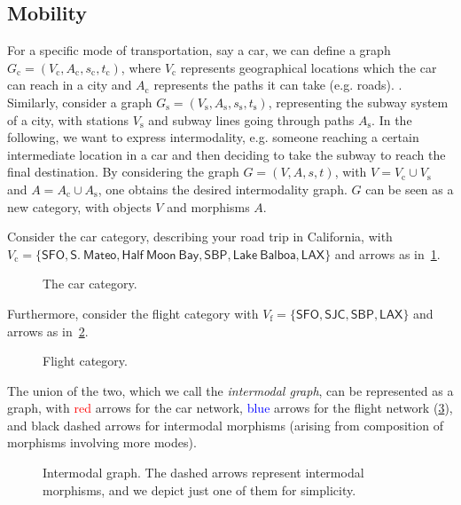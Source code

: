\subsection{Mobility}

For a specific mode of transportation, say a car, we can define a graph $G_\mathrm{c}=(V_\mathrm{c},A_\mathrm{c},s_\mathrm{c},t_\mathrm{c})$, where $V_\mathrm{c}$ represents geographical locations which the car can reach in a city and $A_\mathrm{c}$ represents the paths it can take (e.g. roads). . Similarly, consider a graph $G_\mathrm{s}=(V_\mathrm{s},A_\mathrm{s},s_\mathrm{s},t_\mathrm{s})$, representing the subway system of a city, with stations $V_\mathrm{s}$ and subway lines going through paths $A_\mathrm{s}$. In the following, we want to express intermodality, e.g. someone reaching a certain intermediate location in a car and then deciding to take the subway to reach the final destination. By considering the graph $G=(V,A,s,t)$, with $V=V_\mathrm{c}\cup V_\mathrm{s}$ and $A=A_\mathrm{c}\cup A_\mathrm{s}$, one obtains the desired intermodality graph. $G$ can be seen as a new category, with objects $V$ and morphisms $A$.
\begin{example}
Consider the car category, describing your road trip in California, with $V_\mathrm{c}=\{\mathsf{SFO},\mathsf{S.}\ \mathsf{Mateo},\mathsf{Half} \ \mathsf{Moon}\ \mathsf{Bay},\mathsf{SBP},\mathsf{Lake}\ \mathsf{Balboa},\mathsf{LAX}\}$ and arrows as in~\cref{fig:carcat}.

\begin{figure}[h!]
\begin{center}
\end{center}
\caption{The car category. \label{fig:carcat}}
\end{figure}

Furthermore, consider the flight category with $V_\mathrm{f}=\{\mathsf{SFO},\mathsf{SJC},\mathsf{SBP},\mathsf{LAX}\}$ and arrows as in~\cref{fig:subcat}.


\begin{figure}[h!]
\begin{center}
\end{center}
\caption{Flight category. \label{fig:subcat}}
\end{figure}
The union of the two, which we call the \emph{intermodal graph}, can be represented as a graph, with \textcolor{red}{red} arrows for the car network, \textcolor{blue}{blue} arrows for the flight network (\cref{fig:intermodal}), and black dashed arrows for intermodal morphisms (arising from composition of morphisms involving more modes).

\begin{figure}[h!]
\begin{center}
\end{center}
\caption{Intermodal graph. The dashed arrows represent intermodal morphisms, and we depict just one of them for simplicity. \label{fig:intermodal}}
\end{figure}
\end{example}

